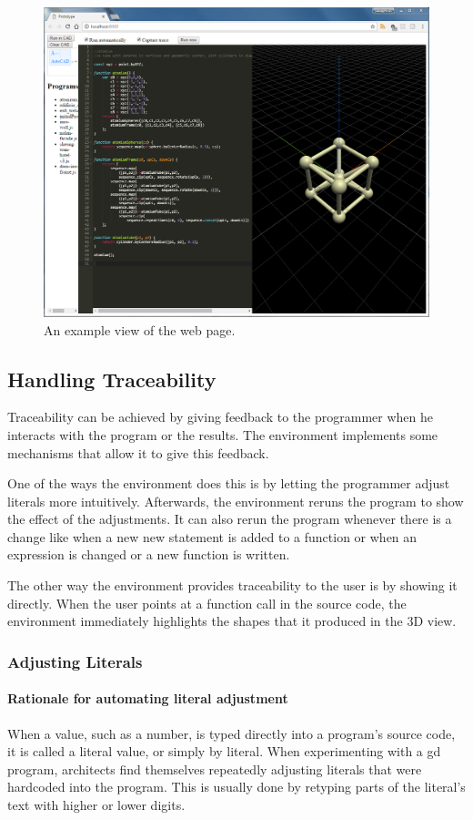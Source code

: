 \begin{figure}
  \centering
  \includegraphics[width=12cm]{./images/webpage_view}
  \caption{An example view of the web page.}
  \label{fig:page:view}
\end{figure}


\subsection{Handling Traceability}
Traceability can be achieved by giving feedback to the programmer when he interacts with the program or the results.
The environment implements some mechanisms that allow it to give this feedback.

One of the ways the environment does this is by letting the programmer adjust literals more intuitively.
Afterwards, the environment reruns the program to show the effect of the adjustments.
It can also rerun the program whenever there is a change like when a new new statement is added to a function or when an expression is changed or a new function is written.

The other way the environment provides traceability to the user is by showing it directly.
When the user points at a function call in the source code, the environment immediately highlights the shapes that it produced in the 3D view.


\subsubsection{Adjusting Literals}
\paragraph{Rationale for automating literal adjustment}
When a value, such as a number, is typed directly into a program's source code, it is called a literal value, or simply by literal.
When experimenting with a \gls{gd} program, architects find themselves repeatedly adjusting literals that were hardcoded into the program.
This is usually done by retyping parts of the literal's text with higher or lower digits.

